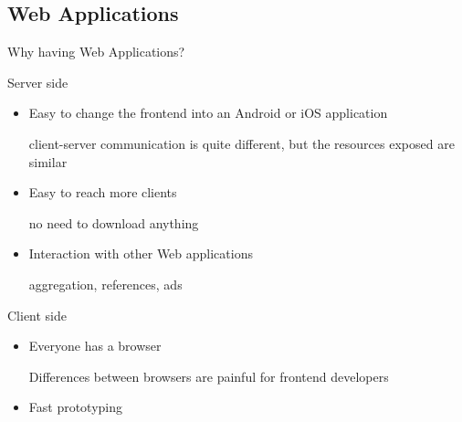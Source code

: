 


\begin{reveals}
		
\maketitle


\section{Web Applications}

\begin{frame}[c]{Why having Web Applications?}
  
  \begin{block}{Server side}
    \begin{itemize}
    \item Easy to change the frontend into an Android or iOS
      application
      \begin{center}
        \color{red}client-server communication is quite different, but
        the resources exposed are similar
      \end{center}
    \item Easy to reach more clients
      \begin{center}
        \color{red}no need to download anything
      \end{center}
    \item Interaction with other Web applications
      \begin{center}
        \color{red}aggregation, references, ads
      \end{center}
    \end{itemize}
  \end{block}

  \vfill

  \begin{block}{Client side}
    \begin{itemize}
    \item Everyone has a browser
      \begin{center}
        \color{red}Differences between browsers are painful for frontend developers
      \end{center}
    \item Fast prototyping
    \end{itemize}
  \end{block}

\end{frame}



\end{reveals}
